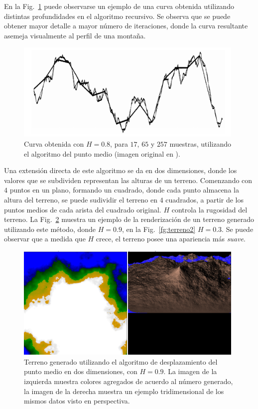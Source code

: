 En la Fig.~\ref{fg:puntomedio} puede observarse un ejemplo de una curva obtenida utilizando distintas profundidades en el algoritmo recursivo.
Se observa que se puede obtener mayor detalle a mayor número de iteraciones, donde la curva resultante asemeja visualmente al perfil de una montaña.

\begin{figure}
\center
\includegraphics[width=11cm]{figures/puntomedio}
\caption[Curva obtenida utilizando el algoritmo del punto medio]{Curva obtenida con $H=0.8$, para $17$, $65$ y $257$ muestras, utilizando el algoritmo del punto medio (imagen original en \cite{Delrieux1995}).}
\label{fg:puntomedio}
\end{figure}


Una extensión directa de este algoritmo se da en dos dimensiones, donde los valores que se subdividen representan las alturas de un terreno.
Comenzando con $4$ puntos en un plano, formando un cuadrado, donde cada punto almacena la altura del terreno, se puede sudividir el terreno en $4$ cuadrados, a partir de los puntos medios de cada arista del cuadrado original.
$H$ controla la rugosidad del terreno.
La Fig.~\ref{fg:terreno} muestra un ejemplo de la renderización de un terreno generado utilizando este método, donde $H = 0.9$, en la Fig.~\ref{fg:terreno2} $H = 0.3$.
Se puede observar que a medida que $H$ crece, el terreno posee una apariencia más {\em suave}.

\begin{figure}
\center
\includegraphics[width=11cm]{figures/terreno}
\caption[Terreno generado utilizando el algoritmo de desplazamiento del punto medio en dos dimensiones, con $H = 0.9$]{Terreno generado utilizando el algoritmo de desplazamiento del punto medio en dos dimensiones, con $H = 0.9$. La imagen de la izquierda muestra colores agregados de acuerdo al número generado, la imagen de la derecha muestra un ejemplo tridimensional de los mismos datos visto en perspectiva.}
\label{fg:terreno}
\end{figure}

